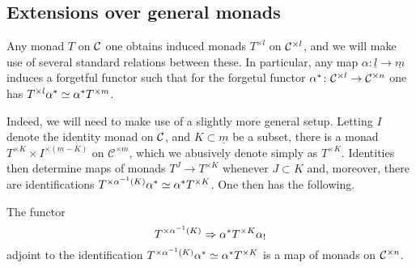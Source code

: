 \documentclass[a4paper,10pt]{article}%
\begin{document}
\subsection{Extensions over general monads}\label{EXTGENMON SEC}

Any monad $T$ on $\mathcal{C}$ one obtains induced monads $T^{\times l}$ on $\mathcal{C}^{\times l}$, and we will make use of several standard relations between these.
In particular, any map $\alpha \colon \underline{l} \to \underline{m}$ induces a forgetful functor
such that for the forgetul functor 
$\alpha^{\**} \colon \C^{\times l} \to \C^{\times n}$
one has $T^{\times l} \alpha^{\**} \simeq  \alpha^{\**} T^{\times m}$.


Indeed, we will need to make use of a slightly more general setup. Letting $I$ denote the identity monad on $\mathcal{C}$, and $K \subset \underline{m}$ be a subset, there is a monad $T^{\times K} \times I^{\times(\underline{m}-K)}$ on $\mathcal{C}^{\times m}$, which we abusively denote simply as $T^{\times K}$. Identities then determine maps of monads 
$T^{J} \to T^{\times K}$ whenever $J \subset K$
and, moreover, there are identifications
$T^{\times \alpha^{-1}(K)} \alpha^{\**} \simeq \alpha^{\**} T^{\times K}$.
One then has the following.


\begin{proposition}\label{MONADICFUN PROP}
  The functor
  \begin{equation}\label{MONADFUNCTORALPHA EQ}
    T^{\times \alpha^{-1} (K)} \Rightarrow \alpha^{\**} T^{\times K} \alpha_{!}
  \end{equation}
  adjoint to the identification 
  $T^{\times \alpha^{-1} (K)} \alpha^{\**} \simeq \alpha^{\**} T^{\times K}$
  is a map of monads on $\mathcal{C}^{\times n}$.
\end{proposition}
\end{document}
